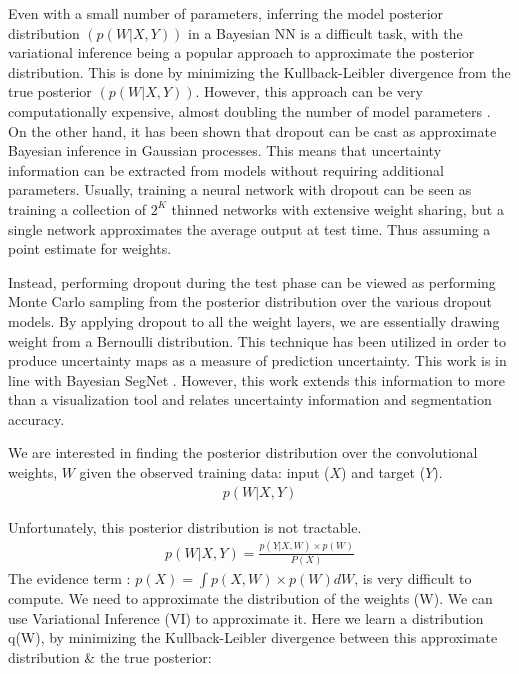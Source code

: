 Even with a small number of parameters, inferring the model posterior distribution $(p(W \vert X,Y))$ in a Bayesian NN is a difficult task, with the variational inference being a popular approach to approximate the posterior distribution. This is done by minimizing the Kullback-Leibler divergence from the true posterior $(p(W \vert X,Y))$. However, this approach can be very computationally expensive, almost doubling the number of model parameters \parencite{blundell2015weight}. On the other hand, it has been shown that dropout can be cast as approximate Bayesian inference in Gaussian processes. This means that uncertainty information can be extracted from models without requiring additional parameters. Usually, training a neural network with dropout can be seen as training a collection of $2^K$ thinned networks with extensive weight sharing, but a single network approximates the average output at test time. Thus assuming a point estimate for weights. 

Instead, performing dropout during the test phase can be viewed as performing Monte Carlo sampling from the posterior distribution over the various dropout models. By applying dropout to all the weight layers, we are essentially drawing weight from a Bernoulli distribution. This technique has been utilized in order to produce uncertainty maps as a measure of prediction uncertainty. This work is in line with Bayesian SegNet \parencite{kendall2015bayesian}. However, this work extends this information to more than a visualization tool and relates uncertainty information and segmentation accuracy. 

We are interested in finding the posterior distribution over the convolutional weights, $W$ given the observed training data: input ($X$) and target ($Y$).
    \begin{gather*} 
    p(W\vert X,Y)
    \end{gather*}

Unfortunately, this posterior distribution is not tractable.
  \begin{gather*} 
    p(W\vert X,Y) = \frac{p(Y\vert X,W)\times p(W)}{P(X)}
    \end{gather*}
The evidence term : $p(X) = \int p(X, W) \times p(W) dW$, is very difficult to compute. We need to approximate the distribution of the weights (W). We can use Variational Inference (VI) to approximate it. Here we learn a distribution q(W), by minimizing the Kullback-Leibler divergence between this approximate distribution \& the true posterior:

